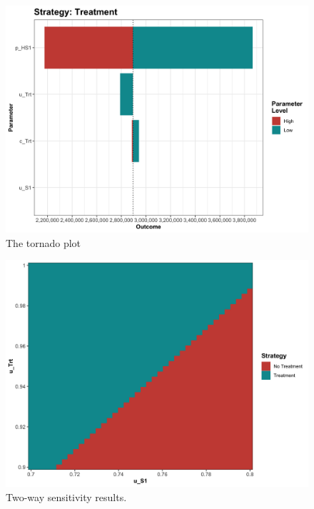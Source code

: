 \documentclass[]{book}
\begin{document}
\begin{figure}

{\centering \includegraphics[width=1\linewidth]{../figs/05a_tornado_Treatment_nmb} 

}

\caption{The tornado plot}\label{fig:05a-tornado-Treatment-nmb}
\end{figure}

\begin{figure}

{\centering \includegraphics[width=1\linewidth]{../figs/05a_twsa_uS1_uTrt_nmb} 

}

\caption{Two-way sensitivity results.}\label{fig:05a-twsa-uS1-uTrt-nmb}
\end{figure}
\end{document}
